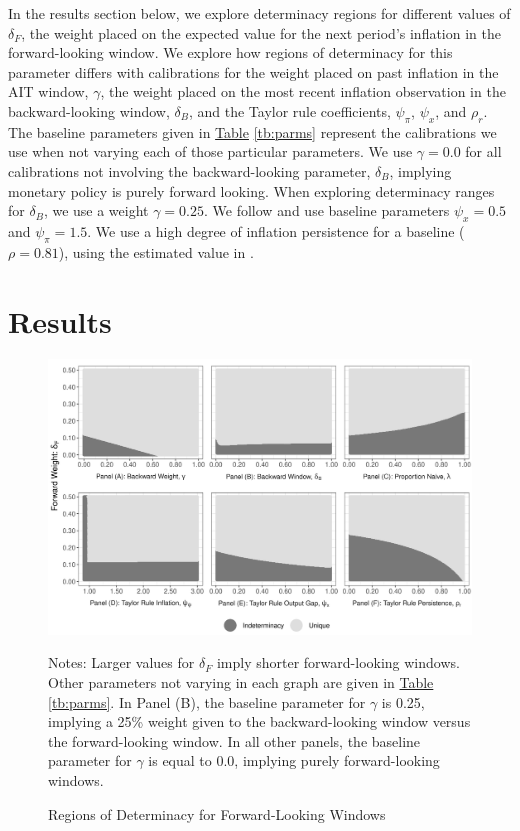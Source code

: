 \documentclass[english,authoryear,12pt]{elsarticle}
\begin{document}
In the results section below, we explore determinacy regions for different values of $\delta_F$, the weight placed on the expected value for the next period's inflation in the forward-looking window. We explore how regions of determinacy for this parameter differs with calibrations for the weight placed on past inflation in the AIT window, $\gamma$, the weight placed on the most recent inflation observation in the backward-looking window, $\delta_B$, and the Taylor rule coefficients, $\psi_\pi$, $\psi_x$, and $\rho_r$. The baseline parameters given in \href{tb:parms}{Table} \ref{tb:parms} represent the calibrations we use when not varying each of those particular parameters. We use $\gamma=0.0$ for all calibrations not involving the backward-looking parameter, $\delta_B$, implying monetary policy is purely forward looking. When exploring determinacy ranges for $\delta_B$, we use a weight $\gamma=0.25$. We follow \citet{taylor1993} and use baseline parameters  $\psi_x=0.5$ and $\psi_\pi = 1.5$. We use a high degree of inflation persistence for a baseline ($\rho=0.81$), using the estimated value in \citet{smetswouters2007}.

\section{Results}

\begin{figure}
	\captionsetup{justification=centering}
	\begin{center}
		\includegraphics[width=\textwidth]{./determinacy_notitle.png}
		\vspace*{3pc}\hspace*{2pc}\parbox{0.9\textwidth}{\small{
			Notes: Larger values for $\delta_F$ imply shorter forward-looking windows. Other parameters not varying in each graph are given in \href{tb:parms}{Table} \ref{tb:parms}. In Panel (B), the baseline parameter for $\gamma$ is 0.25, implying a 25\% weight given to the backward-looking window versus the forward-looking window. In all other panels, the baseline parameter for $\gamma$ is equal to 0.0, implying purely forward-looking windows.}
		}
	\end{center}
	\vspace*{-4pc}\caption{Regions of Determinacy for Forward-Looking Windows}\label{fg:determinacy}
\end{figure}
\end{document}

